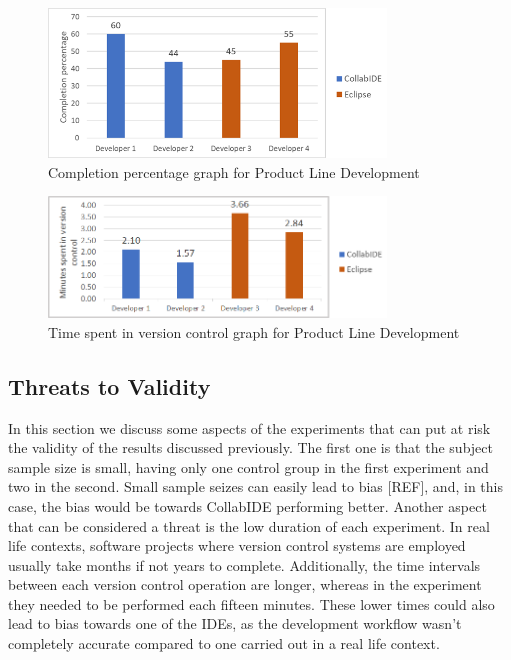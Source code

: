\begin{figure}[htbp]
  \centering
  \includegraphics[width=0.8\textwidth]{img/completionProductLine}
  \caption{Completion percentage graph for Product Line Development}
  \label{fig:completionProductLine}
\end{figure}

\begin{figure}[htbp]
  \centering
  \includegraphics[width=0.8\textwidth]{img/versionControlProductLine}
  \caption{Time spent in version control graph for Product Line Development}
  \label{fig:versionControlProductLine}
\end{figure}

\subsection{Threats to Validity}
In this section we discuss some aspects of the experiments that can put at risk the validity of the results discussed previously. The first one is that the subject sample size is small, having only one control group in the first experiment and two in the second. Small sample seizes can easily lead to bias [REF], and, in this case, the bias would be towards CollabIDE performing better. Another aspect that can be considered a threat is the low duration of each experiment. In real life contexts, software projects where version control systems are employed usually take months if not years to complete. Additionally, the time intervals between each version control operation are longer, whereas in the experiment they needed to be performed each fifteen minutes. These lower times could also lead to bias towards one of the IDEs, as the development workflow wasn’t completely accurate compared to one carried out in a real life context. 


\endinput
